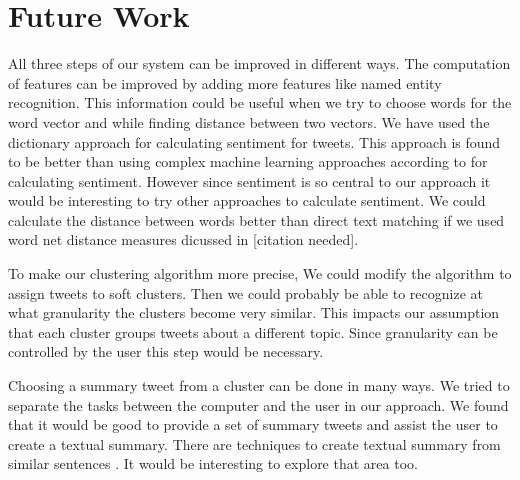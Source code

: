 \section{Future Work}

All three steps of our system can be improved in different ways. The computation of features can be improved by adding more features like named entity recognition. This information could be useful when we try to choose words for the word vector and while finding distance between two vectors. We have used the dictionary approach for calculating sentiment for tweets. This approach is found to be better than using complex machine learning approaches according to \citet{DBLP:journals/corr/abs-0911-1583} for calculating sentiment. However since sentiment is so central to our approach it would be interesting to try other approaches to calculate sentiment. We could calculate the distance between words better than direct text matching if we used word net distance measures dicussed in [citation needed]. 

To make our clustering algorithm more precise, We could modify the algorithm to assign tweets to soft clusters. Then we could probably be able to recognize at what granularity the clusters become very similar. This impacts our assumption that each cluster groups tweets about a different topic. Since granularity can be controlled by the user this step would be necessary. 

Choosing a summary tweet from a cluster can be done in many ways. We tried to separate the tasks between the computer and the user in our approach. We found that it would be good to provide a set of summary tweets and assist the user to create a textual summary. There are techniques to create textual summary from similar sentences \cite{Barzilay:1999:IFC:1034678.1034760}. It would be interesting to explore that area too. 
